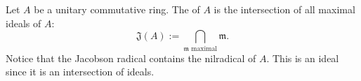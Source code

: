 \documentclass [preview, border = 20pt] {standalone}
\begin{document}
\pagecolor{black}
\color{white}
Let $A$ be a unitary commutative ring. The  of $A$ is the intersection of all maximal ideals of $A$:
\[
\mathfrak J(A) := \bigcap_{\mathfrak m \textrm{ maximal}} \mathfrak m.
\]
Notice that the Jacobson radical contains the nilradical of $A$. This is an ideal since it is an intersection of ideals.
\end{document}
